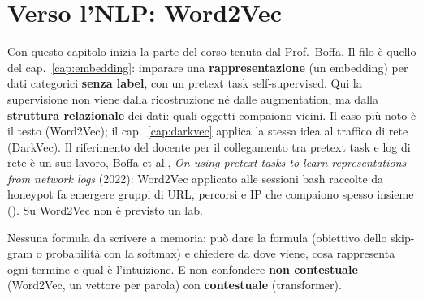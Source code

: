 \chapter{Verso l'NLP: Word2Vec}
\label{cap:word2vec}

Con questo capitolo inizia la parte del corso tenuta dal Prof.~Boffa. Il filo è quello del cap.~\ref{cap:embedding}: imparare
una \textbf{rappresentazione} (un embedding) per dati categorici \textbf{senza label}, con un pretext task self-supervised. Qui la
supervisione non viene dalla ricostruzione né dalle augmentation, ma dalla \textbf{struttura relazionale} dei dati: quali oggetti
compaiono vicini. Il caso più noto è il testo (Word2Vec); il cap.~\ref{cap:darkvec} applica la stessa idea al traffico di rete
(DarkVec). Il riferimento del docente per il collegamento tra pretext task e log di rete è un suo lavoro, Boffa et al., \emph{On using
pretext tasks to learn representations from network logs} (2022): Word2Vec applicato alle sessioni bash raccolte da honeypot fa emergere
gruppi di URL, percorsi e IP che compaiono spesso insieme (). Su Word2Vec non è previsto un lab.

\begin{esame}
Nessuna formula da scrivere a memoria: può dare la formula (obiettivo dello skip-gram o probabilità con la softmax) e chiedere da dove
viene, cosa rappresenta ogni termine e qual è l'intuizione. E non confondere \textbf{non contestuale} (Word2Vec, un vettore per parola)
con \textbf{contestuale} (transformer).
\end{esame}

